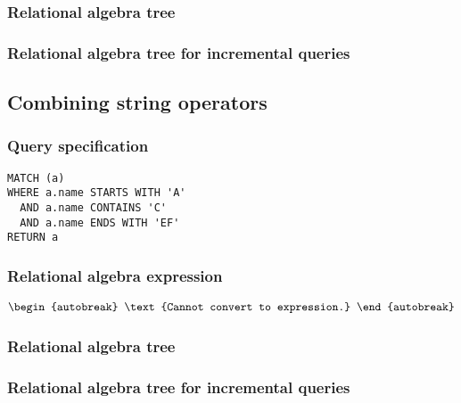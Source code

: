 \subsubsection*{Relational algebra tree}


\subsubsection*{Relational algebra tree for incremental queries}


\subsection{Combining string operators}

\subsubsection*{Query specification}

\begin{lstlisting}
MATCH (a)
WHERE a.name STARTS WITH 'A'
  AND a.name CONTAINS 'C'
  AND a.name ENDS WITH 'EF'
RETURN a
\end{lstlisting}

\subsubsection*{Relational algebra expression}

\begin{align*}
\begin{autobreak}
\text{Cannot convert to expression.}
\end{autobreak}
\end{align*}

\subsubsection*{Relational algebra tree}


\subsubsection*{Relational algebra tree for incremental queries}

